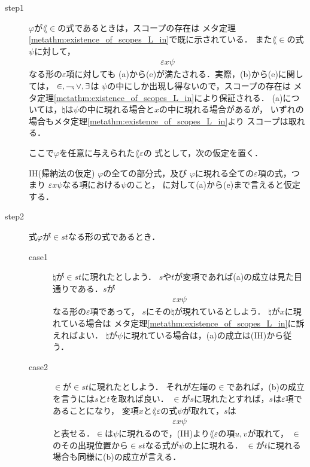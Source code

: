 	\begin{metaprf}\mbox{}
		\begin{description}
			\item[step1]
				$\varphi$が$\lang{\in}$の式であるときは，スコープの存在は
				メタ定理\ref{metathm:existence_of_scopes_L_in}で既に示されている．
				また$\lang{\in}$の式$\psi$に対して，
				\begin{align}
					\varepsilon x \psi
				\end{align}
				なる形の$\varepsilon$項に対しても
				(a)から(e)が満たされる．実際，(b)から(e)に関しては，
				$\in,\rightharpoondown\hspace{-0.25em},\vee,\exists$は
				$\psi$の中にしか出現し得ないので，スコープの存在は
				メタ定理\ref{metathm:existence_of_scopes_L_in}により保証される．
				(a)については，$\natural$は$\psi$の中に現れる場合と$x$の中に現れる場合があるが，
				いずれの場合もメタ定理\ref{metathm:existence_of_scopes_L_in}より
				スコープは取れる．
			
				ここで$\varphi$を任意に与えられた$\lang{\varepsilon}$の
				式として，次の仮定を置く．
				\begin{itembox}[l]{IH(帰納法の仮定)}
					$\varphi$の全ての部分式，及び
					$\varphi$に現れる全ての$\varepsilon$項の式，つまり
					$\varepsilon x \psi$なる項における$\psi$のこと，
					に対して(a)から(e)まで言えると仮定する．
				\end{itembox}
				
			\item[step2]
				式$\varphi$が$\in s t$なる形の式であるとき．
				\begin{description}
					\item[case1]
						$\natural$が$\in s t$に現れたとしよう．
						$s$や$t$が変項であれば(a)の成立は見た目通りである．$s$が
						\begin{align}
							\varepsilon x \psi
						\end{align}
						なる形の$\varepsilon$項であって，
						$s$にその$\natural$が現れているとしよう．
						$\natural$が$x$に現れている場合は
						メタ定理\ref{metathm:existence_of_scopes_L_in}に訴えればよい．
						$\natural$が$\psi$に現れている場合は，(a)の成立は(IH)から従う．
						
					\item[case2]
						$\in$が$\in s t$に現れたとしよう．
						それが左端の$\in$であれば，(b)の成立を言うには$s$と$t$を取れば良い．
						$\in$が$s$に現れたとすれば，$s$は$\varepsilon$項であることになり，
						変項$x$と$\lang{\varepsilon}$の式$\psi$が取れて，$s$は
						\begin{align}
							\varepsilon x \psi
						\end{align}
						と表せる．$\in$は$\psi$に現れるので，(IH)より$\lang{\varepsilon}$の項$u,v$が取れて，
						$\in$のその出現位置から$\in s t$なる式が$\psi$の上に現れる．
						$\in$が$t$に現れる場合も同様に(b)の成立が言える．
				

\end{description}
\end{description}
\end{metaprf}
